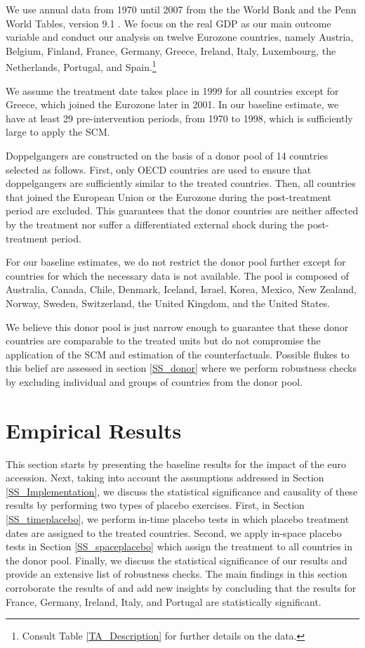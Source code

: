 \documentclass[12pt]{article}
\begin{document}
We use annual data from 1970 until 2007 from the the World Bank and the Penn World Tables, version 9.1 \citep{Feenstra2015}. We focus on the real GDP as our main outcome variable and conduct our analysis on twelve Eurozone countries, namely Austria, Belgium, Finland, France, Germany, Greece, Ireland, Italy, Luxembourg, the Netherlands, Portugal, and Spain.\footnote{Consult Table \ref{TA_Description} for further details on the data.}

We assume the treatment date takes place in 1999 for all countries except for Greece, which joined the Eurozone later in 2001. In our baseline estimate, we have at least 29 pre-intervention periods, from 1970 to 1998, which is sufficiently large to apply the SCM.

Doppelgangers are constructed on the basis of a donor pool of 14 countries selected as follows. First, only OECD countries are used to ensure that doppelgangers are sufficiently similar to the treated countries. Then, all countries that joined the European Union or the Eurozone during the post-treatment period are excluded. This guarantees that the donor countries are neither affected by the treatment nor suffer a differentiated external shock during the post-treatment period. 

For our baseline estimates, we do not restrict the donor pool further except for countries for which the necessary data is not available. The pool is composed of Australia, Canada, Chile, Denmark, Iceland, Israel, Korea, Mexico, New Zealand, Norway, Sweden, Switzerland, the United Kingdom, and the United States. 

We believe this donor pool is just narrow enough to guarantee that these donor countries are comparable to the treated units but do not compromise the application of the SCM and estimation of the counterfactuals. Possible flukes to this belief are assessed in section \ref{SS_donor} where we perform robustness checks by excluding individual and groups of countries from the donor pool.

\section{Empirical Results \label{S_results}}

This section starts by presenting the baseline results for the impact of the euro accession. Next, taking into account the assumptions addressed in Section \ref{SS_Implementation}, we discuss the statistical significance and causality of these results by performing two types of placebo exercises. First, in Section \ref{SS_timeplacebo}, we perform in-time placebo tests in which placebo treatment dates are assigned to the treated countries. Second, we apply in-space placebo tests in Section \ref{SS_spaceplacebo} which assign the treatment to all countries in the donor pool. Finally, we discuss the statistical significance of our results and provide an extensive list of robustness checks. The main findings in this section corroborate the results of \cite{Puzzello2018} and add new insights by concluding that the results for France, Germany, Ireland, Italy, and Portugal are statistically significant.
\end{document}
